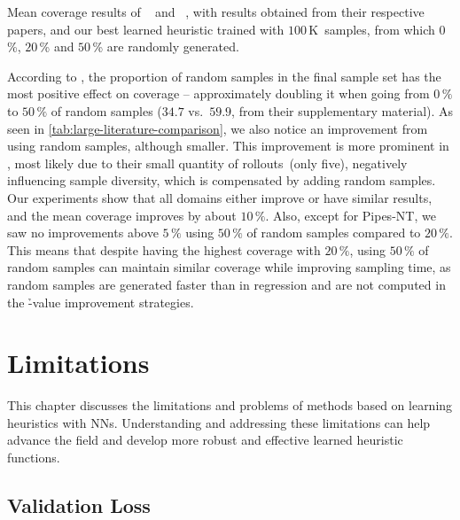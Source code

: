 \begin{table}[tb]
    \caption[Mean coverage results of our approach compared to those in the literature.]{Mean coverage results of \hboot~\cite{ferber2022neural} and \hnrsl~\cite{otoole2022sampling}, with results obtained from their respective papers, and our best learned heuristic trained with $100$\,K~samples, from which $0$\,\%, $20$\,\% and $50$\,\% are randomly generated.}
    \label{tab:large-literature-comparison}
    \addmargin
    \centering
    
\end{table}

According to \citet{otoole2022sampling}, the proportion of random samples in the final sample set has the most positive effect on coverage -- approximately doubling it when going from $0\,\%$ to $50\,\%$ of random samples ($34.7$ vs.~$59.9$, from their supplementary material). As seen in \cref{tab:large-literature-comparison}, we also notice an improvement from using random samples, although smaller. This improvement is more prominent in \citet{otoole2022sampling}, most likely due to their small quantity of rollouts~(only five), negatively influencing sample diversity, which is compensated by adding random samples. Our experiments show that all domains either improve or have similar results, and the mean coverage improves by about $10\,\%$. Also, except for Pipes-NT, we saw no improvements above $5\,\%$ using $50\,\%$ of random samples compared to $20\,\%$. This means that despite having the highest coverage with $20\,\%$, using $50\,\%$ of random samples can maintain similar coverage while improving sampling time, as random samples are generated faster than in regression and are not computed in the \h-value improvement strategies.

\section{Limitations}
\label{sec:limitations}

This chapter discusses the limitations and problems of methods based on learning heuristics with NNs. Understanding and addressing these limitations can help advance the field and develop more robust and effective learned heuristic functions.

\subsection{Validation Loss}
\label{sec:validation-loss}


